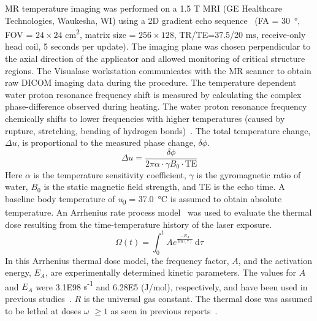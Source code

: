 \documentclass[12pt]{article}
\newcommand{\numberofpatientsLOOCV}{22 }
\begin{document}
MR temperature imaging was performed on a 1.5 T MRI
(GE Healthcare Technologies, Waukesha, WI)
using a 2D gradient echo sequence~\cite{staffordetal04} 
(FA = \SI{30}{\degree}, FOV = $24 \times 24$ cm\textsuperscript{2}, matrix size = $256 \times 128$, 
TR/TE=37.5/20 ms, receive-only head coil,  
5 sec{\color{red}onds} per update).
The imaging plane was chosen perpendicular to the axial direction of the applicator 
and allowed monitoring of critical structure regions.
The Visualase\textsuperscript{\textregistered} workstation communicates with the MR scanner to obtain
raw DICOM imaging data during the procedure.
The temperature dependent water proton resonance frequency shift is measured
by calculating the complex phase-difference observed during heating.
The water proton resonance frequency chemically shifts to lower
frequencies with higher temperatures (caused by rupture,
stretching, bending of hydrogen bonds)~\cite{ishihara1995paf}.
The total
temperature change, $\Delta u$, is proportional to the measured
phase change, $\delta \phi$.
\[
\Delta u = \frac{ \delta \phi } { 2 \pi \alpha \cdot \gamma B_0 \cdot \text{TE}}
\]
Here $\alpha$ is the temperature sensitivity coefficient, $\gamma$ is the
gyromagnetic ratio of water, $B_0$ is the static magnetic field strength, and
TE is the echo time.  
A baseline body temperature of \textit{u}\textsubscript{0} = \SI{37.0}{\degreeCelsius} is assumed to obtain
absolute temperature.
An Arrhenius rate process model~\cite{pearce1995rate}
was used to evaluate the thermal dose resulting from the
time-temperature history of the laser exposure.
\begin{equation}\label{ArrheniusDamage}
\text{$\Omega$}(t) = 
      \int_0^t \! Ae^{\frac{-E_A}{Ru(\tau)}} \, \mathrm{d} \tau
\end{equation}
In this Arrhenius thermal dose model, the frequency factor, $A$,
and the activation energy, $E_A$, are 
experimentally determined kinetic parameters. The values for $A$ and
$E_A$ were 3.1E98 {\color{red}s\textsuperscript{-1}} and 6.28E5 {\color{red}(J/mol)},
respectively, and have been used in previous
studies~\cite{carpentieretal08,schwarzmaier1998treatment,mcnichols2004mr}. 
$R$ is the universal gas constant.  The thermal dose was assumed to
be lethal at doses $\omega$  $\geq 1$ as seen in previous
reports~\cite{carpentieretal08,mcnichols2004mr}. 

\end{document}
